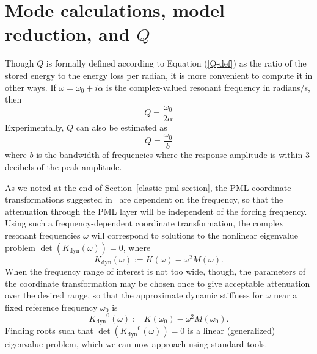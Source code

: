 \documentclass{article}
\newcommand{\Kdynamic}{\ensuremath{K_{\mathrm{dyn}}}}
\begin{document}
\section{Mode calculations, model reduction, and $Q$}

Though $Q$ is formally defined according to Equation (\ref{Q-def}) as
the ratio of the stored energy to the energy loss per radian, it is
more convenient to compute it in other ways.  If 
$\omega = \omega_0 + i \alpha$ is the complex-valued resonant frequency 
in radians/s, then~\cite{Senturia:2001:MD}
\begin{equation}
  Q = \frac{\omega_0}{2 \alpha}
\end{equation}
Experimentally, $Q$ can also be estimated as
\begin{equation}
  Q = \frac{\omega_0}{b}
\end{equation}
where $b$ is the bandwidth of frequencies where the response amplitude
is within $3$ decibels of the peak amplitude.

As we noted at the end of Section~\ref{elastic-pml-section}, the PML
coordinate transformations suggested in~\cite{Basu:2003:PML} are
dependent on the frequency, so that the attenuation through the PML
layer will be independent of the forcing frequency.  Using such a
frequency-dependent coordinate transformation, the complex resonant
frequencies $\omega$ will correspond to solutions to the nonlinear
eigenvalue problem $\det(\Kdynamic(\omega)) = 0$, where
\begin{equation}
  \Kdynamic(\omega) := K(\omega) - \omega^2 M(\omega).
\end{equation}
When the frequency range of interest is not too wide, though, the
parameters of the coordinate transformation may be chosen once to give
acceptable attenuation over the desired range, so that the approximate
dynamic stiffness for $\omega$ near a fixed reference frequency
$\omega_0$ is
\begin{equation}
  \Kdynamic^0(\omega) := K(\omega_0) - \omega^2 M(\omega_0).
\end{equation}
Finding roots such that $\det(\Kdynamic^0(\omega)) = 0$ is a linear
(generalized) eigenvalue problem, which we can now approach using
standard tools.
\end{document}
